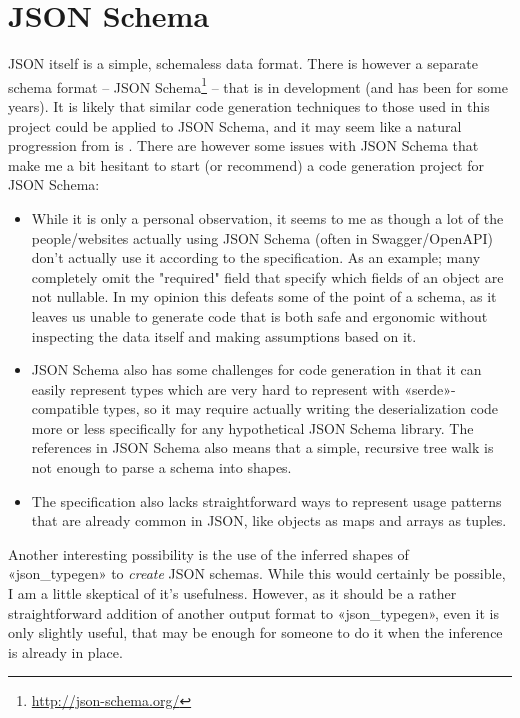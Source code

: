 \section{JSON Schema}

JSON itself is a simple, schemaless data format. There is however a separate schema format -- JSON Schema\footnote{\url{http://json-schema.org/}} -- that is in development (and has been for some years). It is likely that similar code generation techniques to those used in this project could be applied to JSON Schema, and it may seem like a natural progression from  is . There are however some issues with JSON Schema that make me a bit hesitant to start (or recommend) a code generation project for JSON Schema:

\begin{itemize}
  \item While it is only a personal observation, it seems to me as though a lot of the people/websites actually using JSON Schema (often in Swagger/OpenAPI) don't actually use it according to the specification. As an example; many completely omit the "required" field that specify which fields of an object are not nullable. In my opinion this defeats some of the point of a schema, as it leaves us unable to generate code that is both safe and ergonomic without inspecting the data itself and making assumptions based on it.
  \item JSON Schema also has some challenges for code generation in that it can easily represent types which are very hard to represent with «serde»-compatible types, so it may require actually writing the deserialization code more or less specifically for any hypothetical JSON Schema library. The references in JSON Schema also means that a simple, recursive tree walk is not enough to parse a schema into shapes.
  \item The specification also lacks straightforward ways to represent usage patterns that are already common in JSON, like objects as maps and arrays as tuples.
\end{itemize}

Another interesting possibility is the use of the inferred shapes of «json_typegen» to \emph{create} JSON schemas. While this would certainly be possible, I am a little skeptical of it's usefulness. However, as it should be a rather straightforward addition of another output format to «json_typegen», even it is only slightly useful, that may be enough for someone to do it when the inference is already in place.

